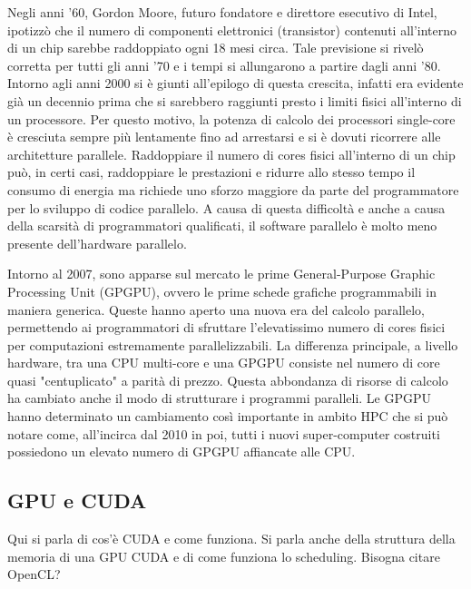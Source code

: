 \documentclass[a4paper]{article}
\begin{document}
	Negli anni '60, Gordon Moore, futuro fondatore e direttore esecutivo di Intel, ipotizzò che il numero di componenti elettronici (transistor) contenuti all'interno di un chip sarebbe raddoppiato ogni 18 mesi circa. Tale previsione si rivelò corretta per tutti gli anni '70 e i tempi si allungarono a partire dagli anni '80. Intorno agli anni 2000 si è giunti all'epilogo di questa crescita, infatti era evidente già un decennio prima che si sarebbero raggiunti presto i limiti fisici all'interno di un processore. Per questo motivo, la potenza di calcolo dei processori single-core è cresciuta sempre più lentamente fino ad arrestarsi e si è dovuti ricorrere alle architetture parallele. Raddoppiare il numero di cores fisici all'interno di un chip può, in certi casi, raddoppiare le prestazioni e ridurre allo stesso tempo il consumo di energia ma richiede uno sforzo maggiore da parte del programmatore per lo sviluppo di codice parallelo. A causa di questa difficoltà e anche a causa della scarsità di programmatori qualificati, il software parallelo è molto meno presente dell'hardware parallelo.
	
	Intorno al 2007, sono apparse sul mercato le prime General-Purpose Graphic Processing Unit (GPGPU), ovvero le prime schede grafiche programmabili in maniera generica. Queste hanno aperto una nuova era del calcolo parallelo, permettendo ai programmatori di sfruttare l'elevatissimo numero di cores fisici per computazioni estremamente parallelizzabili. La differenza principale, a livello hardware, tra una CPU multi-core e una GPGPU consiste nel numero di core quasi "centuplicato" a parità di prezzo. Questa abbondanza di risorse di calcolo ha cambiato anche il modo di strutturare i programmi paralleli. Le GPGPU hanno determinato un cambiamento così importante in ambito HPC che si può notare come, all'incirca dal 2010 in poi, tutti i nuovi super-computer costruiti possiedono un elevato numero di GPGPU affiancate alle CPU.
	
	\subsection{GPU e CUDA}
	Qui si parla di cos'è CUDA e come funziona. Si parla anche della struttura della memoria di una GPU CUDA e di come funziona lo scheduling. Bisogna citare OpenCL?
	
\end{document}
